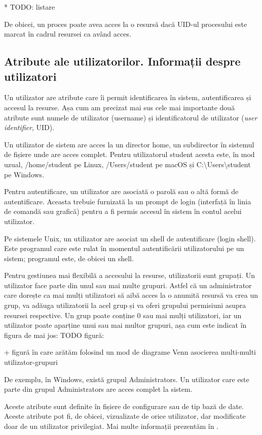 * TODO: listare

De obicei, un proces poate avea acces la o resursă dacă UID-ul procesului este
marcat în cadrul resursei ca având acces.

\subsection{Atribute ale utilizatorilor. Informații despre utilizatori}
\label{sec:users-ops-atribute}

Un utilizator are atribute care îi permit identificarea în sistem,
autentificarea și accesul la resurse. Așa cum am precizat mai sus cele mai
importante două atribute sunt numele de utilizator (username) și identificatorul
de utilizator (\textit{user identifier}, UID).

Un utilizator de sistem are acces la un director home, un subdirector în
sistemul de fișiere unde are acces complet. Pentru utilizatorul student acesta
este, în mod uzual, /home/student pe Linux, /Users/student pe macOS și
C:\textbackslash{}Users\textbackslash{}student pe Windows.

Pentru autentificare, un utilizator are asociată o parolă sau o altă formă de
autentificare. Aceasta trebuie furnizată la un prompt de login (interfață în
linia de comandă sau grafică) pentru a fi permis accesul în sistem în contul
acelui utilizator.

Pe sistemele Unix, un utilizator are asociat un shell de autentificare (login
shell). Este programul care este rulat în momentul autentificării utilizatorului
pe un sistem; programul este, de obicei un shell.

Pentru gestiunea mai flexibilă a accesului la resurse, utilizatorii sunt
grupați. Un utilizator face parte din unul sau mai multe grupuri. Astfel că un
administrator care dorește ca mai mulți utilizatori să aibă acces la o anumită
resursă va crea un grup, va adăuga utilizatorii la acel grup și va oferi
grupului permisiuni asupra resursei respective. Un grup poate conține 0 sau mai
mulți utilizatori, iar un utilizator poate aparține unui sau mai multor grupuri,
așa cum este indicat în figura de mai jos: TODO figură:

+ figură în care arătăm folosind un mod de diagrame Venn asocierea multi-multi utilizator-grupuri

De exemplu, în Windows, există grupul Administrators. Un utilizator care este
parte din grupul Administrators are acces complet la sistem.

Aceste atribute sunt definite în fișiere de configurare sau de tip bază de date.
Aceste atribute pot fi, de obicei, vizualizate de orice utilizator, dar
modificate doar de un utilizator privilegiat. Mai multe informații prezentăm în
.

